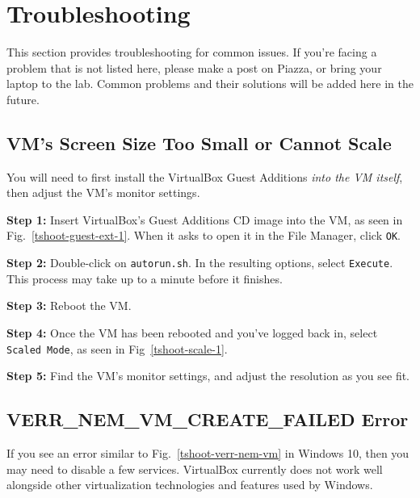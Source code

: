 \documentclass[11pt]{article}
\begin{document}
\newpage
\section{Troubleshooting}
\label{sec:troubleshooting}
This section provides troubleshooting for common issues. If you're facing a problem that is not listed here, please make a post on Piazza, or bring your laptop to the lab. Common problems and their solutions will be added here in the future.

\subsection{VM's Screen Size Too Small or Cannot Scale}
You will need to first install the VirtualBox Guest Additions \textit{into the VM itself}, then adjust the VM's monitor settings.

\textbf{Step 1:} Insert VirtualBox's Guest Additions CD image into the VM, as seen in Fig.~\ref{tshoot-guest-ext-1}. When it asks to open it in the File Manager, click \texttt{OK}.

\textbf{Step 2:} Double-click on \texttt{autorun.sh}. In the resulting options, select \texttt{Execute}. This process may take up to a minute before it finishes.

\textbf{Step 3:} Reboot the VM.

\textbf{Step 4:} Once the VM has been rebooted and you've logged back in, select \texttt{Scaled Mode}, as seen in Fig~\ref{tshoot-scale-1}. 

\textbf{Step 5:} Find the VM's monitor settings, and adjust the resolution as you see fit.


\subsection{VERR\_NEM\_VM\_CREATE\_FAILED Error}
If you see an error similar to Fig.~\ref{tshoot-verr-nem-vm} in Windows 10, then you may need to disable a few services. VirtualBox currently does not work well alongside other virtualization technologies and features used by Windows.
\end{document}
